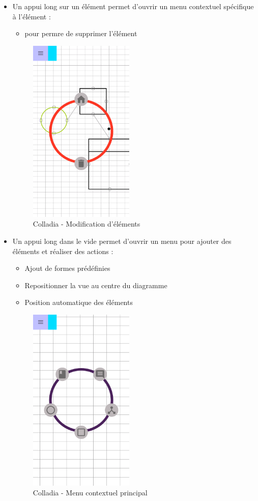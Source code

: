 \begin{itemize}
\item Un appui long sur un élément permet d'ouvrir un menu contextuel spécifique à l'élément :
\begin{itemize}
	\item pour permre de supprimer l'élément
\end{itemize}
		\begin{figure}[!h]
			\centering
			\includegraphics[width=5cm]{img/screen/colladia_draw_view_menu_contextuel_select}
			\caption{Colladia - Modification d'éléments}
		\end{figure}
		
		
\item Un appui long dans le vide permet d'ouvrir un menu pour ajouter des éléments et réaliser des actions :
		\begin{itemize}
			\item Ajout de formes prédéfinies
			\item Repositionner la vue au centre du diagramme
			\item Position automatique des éléments
		\end{itemize}
		\begin{figure}[!h]
			\centering
			\includegraphics[width=5cm]{img/screen/colladia_draw_view_menu_contextuel_main}
			\caption{Colladia - Menu contextuel principal}
		\end{figure}
		

\end{itemize}
